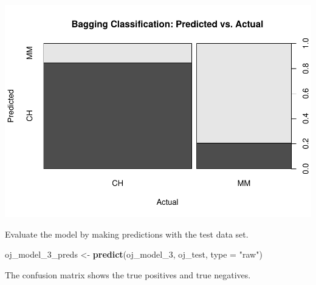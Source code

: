\documentclass[
]{book}
\newenvironment{Shaded}{\begin{snugshade}}{\end{snugshade}}
\newcommand{\DataTypeTok}[1]{\textcolor[rgb]{0.13,0.29,0.53}{#1}}
\newcommand{\DecValTok}[1]{\textcolor[rgb]{0.00,0.00,0.81}{#1}}
\newcommand{\KeywordTok}[1]{\textcolor[rgb]{0.13,0.29,0.53}{\textbf{#1}}}
\newcommand{\NormalTok}[1]{#1}
\newcommand{\OperatorTok}[1]{\textcolor[rgb]{0.81,0.36,0.00}{\textbf{#1}}}
\newcommand{\StringTok}[1]{\textcolor[rgb]{0.31,0.60,0.02}{#1}}
\begin{document}
\includegraphics{data-sci_files/figure-latex/unnamed-chunk-78-1.pdf}

Evaluate the model by making predictions with the test data set.

\begin{Shaded}
\begin{Highlighting}[]
\NormalTok{oj_model_}\DecValTok{3}\NormalTok{_preds <-}\StringTok{ }\KeywordTok{predict}\NormalTok{(oj_model_}\DecValTok{3}\NormalTok{, oj_test, }\DataTypeTok{type =} \StringTok{"raw"}\NormalTok{)}
\end{Highlighting}
\end{Shaded}

The confusion matrix shows the true positives and true negatives.

\begin{Shaded}
\end{Shaded}
\end{document}
